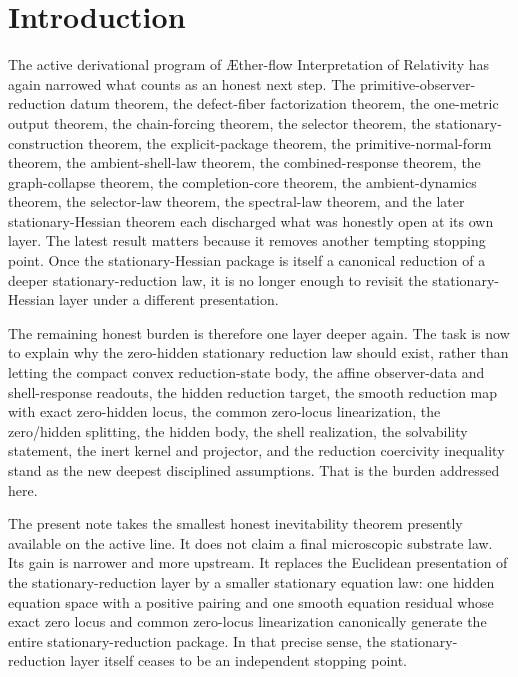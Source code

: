 \documentclass[11pt]{article}
\newcommand{\Aflow}{\AE{}ther-flow}
\newcommand{\TheoryName}{\Aflow{} Interpretation of Relativity}
\begin{document}
\section{Introduction}

The active derivational program of \TheoryName{} has again narrowed what counts as an honest next step. The primitive-observer-reduction datum theorem, the defect-fiber factorization theorem, the one-metric output theorem, the chain-forcing theorem, the selector theorem, the stationary-construction theorem, the explicit-package theorem, the primitive-normal-form theorem, the ambient-shell-law theorem, the combined-response theorem, the graph-collapse theorem, the completion-core theorem, the ambient-dynamics theorem, the selector-law theorem, the spectral-law theorem, and the later stationary-Hessian theorem each discharged what was honestly open at its own layer. The latest result matters because it removes another tempting stopping point. Once the stationary-Hessian package is itself a canonical reduction of a deeper stationary-reduction law, it is no longer enough to revisit the stationary-Hessian layer under a different presentation.

The remaining honest burden is therefore one layer deeper again. The task is now to explain why the zero-hidden stationary reduction law should exist, rather than letting the compact convex reduction-state body, the affine observer-data and shell-response readouts, the hidden reduction target, the smooth reduction map with exact zero-hidden locus, the common zero-locus linearization, the zero/hidden splitting, the hidden body, the shell realization, the solvability statement, the inert kernel and projector, and the reduction coercivity inequality stand as the new deepest disciplined assumptions. That is the burden addressed here.

The present note takes the smallest honest inevitability theorem presently available on the active line. It does not claim a final microscopic substrate law. Its gain is narrower and more upstream. It replaces the Euclidean presentation of the stationary-reduction layer by a smaller stationary equation law: one hidden equation space with a positive pairing and one smooth equation residual whose exact zero locus and common zero-locus linearization canonically generate the entire stationary-reduction package. In that precise sense, the stationary-reduction layer itself ceases to be an independent stopping point.
\end{document}
